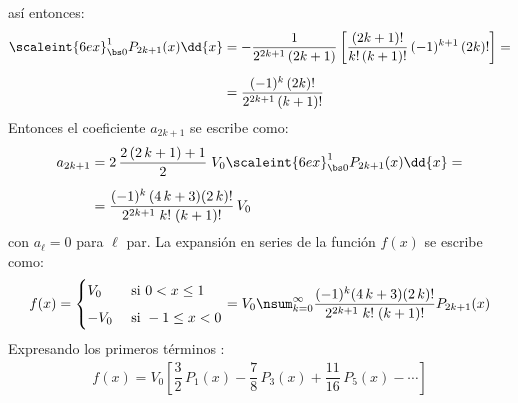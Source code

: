 así entonces:
\begin{align}
\begin{aligned}[b]
\scaleint{6ex}_{\bs 0}^{1} P_{2k+1} (x) \dd{x} &= - \dfrac{1}{2^{2k+1} \, (2k + 1)} \, \bigg[ \dfrac{(2k + 1)!}{k! \, (k + 1)!} \, (-1)^{k+1} \, (2k)! \bigg] = \\[0.5em]
&= \dfrac{(-1)^{k} \, (2k)!}{2^{2k+1} \, (k+1)!}
\end{aligned}
\label{eq:ecuacion_26_49}
\end{align}
Entonces el coeficiente $a_{2k+1}$ se escribe como:
\begin{align*}
a_{2k+1} &= 2 \, \dfrac{2 \, (2 \, k + 1) + 1}{2} \; V_{0} \scaleint{6ex}_{\bs 0}^{1} P_{2k+1} (x) \dd{x} = \\[0.5em]
&= \dfrac{(-1)^{k} \, (4 \, k + 3)(2 \, k)!}{2^{2k+1} \; k! \; (k+1)!} \, V_{0}
\end{align*}
con $a_{\ell} = 0$ para $\ell$ par. La expansión en series de la función $f (x)$ se escribe como:
\begin{align*}
f(x) = \begin{cases}
V_{0} & \mbox{ si } 0 < x \leq 1 \\[0.5em]
-V_{0} & \mbox{ si } -1 \leq x < 0
\end{cases}
= V_{0} \nsum_{k=0}^{\infty} \dfrac{(-1)^{k}(4 \, k + 3)(2 \, k)!}{2^{2k+1} \; k! \; (k+1)!} P_{2k+1} (x)
\end{align*}
Expresando los primeros términos :
\begin{align*}
f (x) = V_{0} \left[ \dfrac{3}{2} \, P_{1}(x) - \dfrac{7}{8} \, P_{3}(x) + \dfrac{11}{16} \, P_{5}(x) - \cdots \right]
\end{align*}





